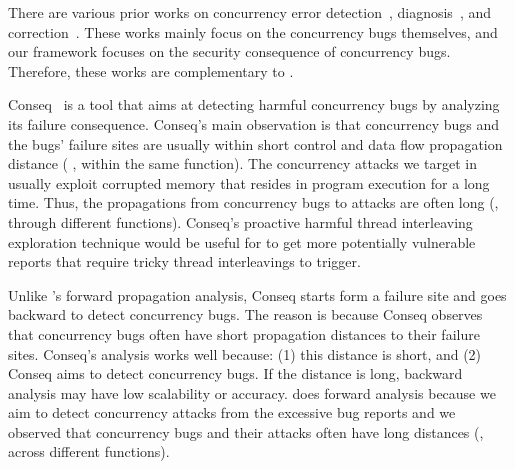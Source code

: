 
 There are various prior works on 
concurrency
error 
detection~\cite{yu:racetrack:sosp,savage:eraser,racerx:sosp03,lu:muvi:sosp,
avio:asplos06,conmem:asplos10,conseq:asplos11},
diagnosis~\cite{racefuzzer:pldi08,
ctrigger:asplos09,atomfuzzer:fse08}, and
correction~\cite{dimmunix:osdi08,gadara:osdi08,wu:loom:osdi10,cfix:osdi12}.
These works mainly focus on the concurrency bugs themselves, and our \xxx
framework focuses on the security consequence of concurrency 
bugs. Therefore, these works are complementary to \xxx.

Conseq~\cite{conseq:asplos11} is a tool that aims at detecting harmful
concurrency bugs by analyzing its failure consequence. Conseq's main
observation is that concurrency bugs and the bugs' failure sites
are usually within short control and data flow propagation distance (
\eg, within the same function). The concurrency attacks we target in \xxx 
usually exploit corrupted memory that resides in program execution for a long 
time. Thus, the propagations from concurrency bugs to attacks are often long 
(\eg, through different functions). Conseq's proactive harmful thread 
interleaving exploration technique would be useful for \xxx to get more 
potentially vulnerable reports that require tricky thread interleavings to 
trigger. 

Unlike \xxx's forward propagation analysis, Conseq starts form a 
failure site and goes backward to detect concurrency bugs. The reason is 
because Conseq observes that concurrency bugs often have short propagation 
distances to their failure sites. Conseq's analysis works well because: (1) 
this distance is short, and (2) Conseq aims to detect concurrency bugs. 
If the distance is long, backward analysis may have low scalability or 
accuracy. \xxx does forward analysis because we aim to detect 
concurrency attacks from the excessive bug reports and we observed that 
concurrency bugs and their attacks often have long distances (\eg, across 
different functions).


